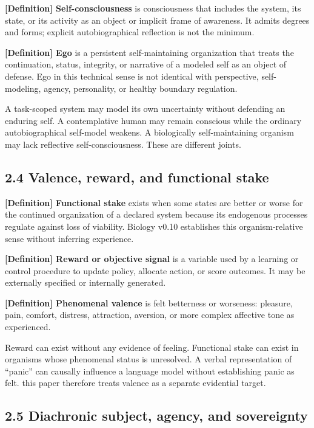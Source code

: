 \documentclass[
  11pt,
]{article}
\begin{document}
\textbf{{[}Definition{]} Self-consciousness} is consciousness that
includes the system, its state, or its activity as an object or implicit
frame of awareness. It admits degrees and forms; explicit
autobiographical reflection is not the minimum.

\textbf{{[}Definition{]} Ego} is a persistent self-maintaining
organization that treats the continuation, status, integrity, or
narrative of a modeled self as an object of defense. Ego in this
technical sense is not identical with perspective, self-modeling,
agency, personality, or healthy boundary regulation.

A task-scoped system may model its own uncertainty without defending an
enduring self. A contemplative human may remain conscious while the
ordinary autobiographical self-model weakens. A biologically
self-maintaining organism may lack reflective self-consciousness. These
are different joints.

\subsection{2.4 Valence, reward, and functional
stake}\label{valence-reward-and-functional-stake}

\textbf{{[}Definition{]} Functional stake} exists when some states are
better or worse for the continued organization of a declared system
because its endogenous processes regulate against loss of viability.
Biology v0.10 establishes this organism-relative sense without inferring
experience.

\textbf{{[}Definition{]} Reward or objective signal} is a variable used
by a learning or control procedure to update policy, allocate action, or
score outcomes. It may be externally specified or internally generated.

\textbf{{[}Definition{]} Phenomenal valence} is felt betterness or
worseness: pleasure, pain, comfort, distress, attraction, aversion, or
more complex affective tone as experienced.

Reward can exist without any evidence of feeling. Functional stake can
exist in organisms whose phenomenal status is unresolved. A verbal
representation of ``panic'' can causally influence a language model
without establishing panic as felt. this paper therefore treats valence
as a separate evidential target.

\subsection{2.5 Diachronic subject, agency, and
sovereignty}\label{diachronic-subject-agency-and-sovereignty}
\end{document}
